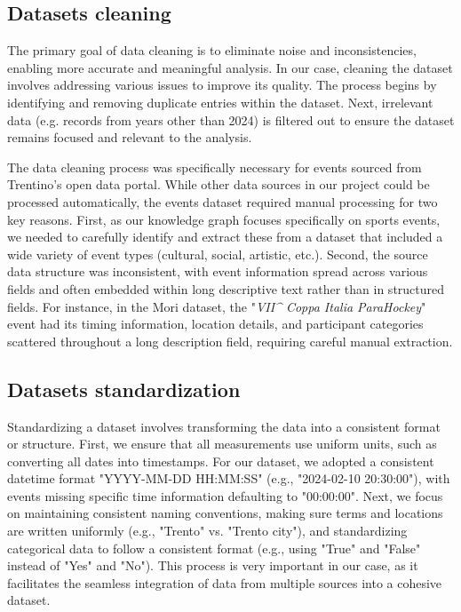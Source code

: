 \subsection{Datasets cleaning}
\noindent The primary goal of data cleaning is to eliminate noise and inconsistencies, enabling more accurate and meaningful analysis. In our case, cleaning the dataset involves addressing various issues to improve its quality. The process begins by identifying and removing duplicate entries within the dataset. Next, irrelevant data (e.g. records from years other than 2024) is filtered out to ensure the dataset remains focused and relevant to the analysis.
\vspace{0.4cm}

\noindent The data cleaning process was specifically necessary for events sourced from Trentino's open data portal. While other data sources in our project could be processed automatically, the events dataset required manual processing for two key reasons. First, as our knowledge graph focuses specifically on sports events, we needed to carefully identify and extract these from a dataset that included a wide variety of event types (cultural, social, artistic, etc.). Second, the source data structure was inconsistent, with event information spread across various fields and often embedded within long descriptive text rather than in structured fields. For instance, in the Mori dataset, the "\textit{VII\^{} Coppa Italia ParaHockey}" event had its timing information, location details, and participant categories scattered throughout a long description field, requiring careful manual extraction.


\subsection{Datasets standardization}
Standardizing a dataset involves transforming the data into a consistent format or structure. First, we ensure that all measurements use uniform units, such as converting all dates into timestamps. For our dataset, we adopted a consistent datetime format "YYYY-MM-DD HH:MM:SS" (e.g., "2024-02-10 20:30:00"), with events missing specific time information defaulting to "00:00:00". Next, we focus on maintaining consistent naming conventions, making sure terms and locations are written uniformly (e.g., "Trento" vs. "Trento city"), and standardizing categorical data to follow a consistent format (e.g., using "True" and "False" instead of "Yes" and "No"). This process is very important in our case, as it facilitates the seamless integration of data from multiple sources into a cohesive dataset.
\vspace{0.4cm}

